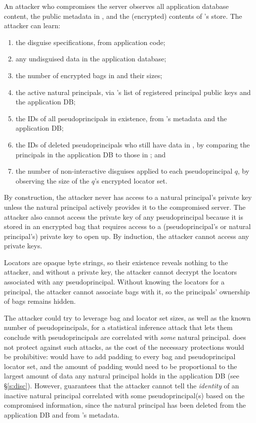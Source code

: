 %
An attacker who compromises the server observes all application
database content, the public metadata in \sys, and the (encrypted) contents of
\sys's store.
%
The attacker can learn:
\begin{enumerate}[nosep]
  \item the disguise specifications, from application code;
  \item any undisguised data in the application database;
  \item the number of encrypted bags in \sys and their sizes;
  \item the active natural principals, via \sys's list of
    registered principal public keys and the application DB;
  \item the IDs of all pseudoprincipals in existence, from \sys's metadata
    and the application DB;
  \item the IDs of deleted pseudoprincipals who still have data in \sys,
    by comparing the principals in the application DB to those in \sys; and
  \item the number of non-interactive disguises applied to each
    pseudoprincipal $q$, by observing the size of the $q$'s encrypted
    locator set.
\end{enumerate}
%
By construction, the attacker never has access to a natural principal's
private key unless the natural principal actively provides it to the
compromised server.
%
The attacker also cannot access the private key of any pseudoprincipal
because it is stored in an encrypted bag that requires access to a
(pseudoprincipal's or natural principal's) private key to open up.
%
By induction, the attacker cannot access any private keys.
%

%
Locators are opaque byte strings, so their existence reveals nothing to the
attacker, and without a private key, the attacker cannot decrypt the
locators associated with any pseudoprincipal.
%
Without knowing the locators for a principal, the attacker cannot associate
bags with it, so the principals' ownership of bags remains hidden.
%

%
The attacker could try to leverage bag and locator set sizes, as well as the
known number of pseudoprincipals, for a statistical inference attack that
lets them conclude with pseudoprincipals are correlated with \emph{some}
natural principal.
%
\sys does not protect against such attacks, as the cost of the necessary
protections would be prohibitive: \sys would have to add padding to every
bag and pseudoprincipal locator set, and the amount of padding would need to
be proportional to the largest amount of data any natural principal holds
in the application DB (see \S\ref{s:disc}).
%
However, \sys guarantees that the attacker cannot tell the \emph{identity}
of an inactive natural principal correlated with some pseudoprincipal(s)
based on the compromised information, since the natural principal has been
deleted from the application DB and from \sys's metadata.
%

